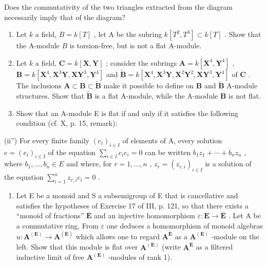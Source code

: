 Does the commutativity of the two triangles extracted from the diagram necessarily imply that of the diagram?

\begin{enumerate}
\def\labelenumi{\arabic{enumi})}
\setcounter{enumi}{3}
\item
  Let \(k\) a field, \(B = k[T]\) , let A be the subring \(k[T^2, T^3] \subset k[T]\) . Show that the A-module \(B\) is torsion-free, but is not a flat A-module.
\item
  Let \(k\) a field, \(\mathbf{C} = k[\mathbf{X}, \mathbf{Y}]\) ; consider the subrings \(\mathbf{A} = k[\mathbf{X}^4, \mathbf{Y}^4]\) , \(\mathbf{B} = k[\mathbf{X}^4, \mathbf{X}^3\mathbf{Y}, \mathbf{XY}^3, \mathbf{Y}^4]\) and \(\tilde{\mathbf{B}} = k[\mathbf{X}^4, \mathbf{X}^3\mathbf{Y}, \mathbf{X}^2\mathbf{Y}^2, \mathbf{XY}^3, \mathbf{Y}^4]\) of \(\mathbf{C}\) . The inclusions \(\mathbf{A} \subset \mathbf{B} \subset \tilde{\mathbf{B}}\) make it possible to define on \(\mathbf{B}\) and \(\tilde{\mathbf{B}}\) A-module structures. Show that \(\tilde{\mathbf{B}}\) is a flat A-module, while the A-module \(\mathbf{B}\) is not flat.
\item
  Show that an A-module E is flat if and only if it satisfies the following condition (cf. X, p. 15, remark):
\end{enumerate}

(ii'') For every finite family \((c_{i})_{i\in I}\) of elements of A, every solution \(e = (e_i)_{i\in I}\) of the equation \(\sum_{i\in I}c_i e_i = 0\) can be written \(b_1 z_1 + \cdots + b_n z_n\) , where \(b_1, \ldots, b_n \in E\) and where, for \(r = 1, \ldots, n\) , \(z_r = (z_{r,i})_{i \in I}\) is a solution of the equation \(\sum_{i=1}^{n} z_{r,i} c_i = 0\) .

\begin{enumerate}
\def\labelenumi{\arabic{enumi})}
\setcounter{enumi}{6}
\tightlist
\item
  Let E be a monoid and S a subsemigroup of E that is cancellative and satisfies the hypotheses of Exercise 17 of III, p. 121, so that there exists a “monoid of fractions” \(\overline{\mathbf{E}}\) and an injective homomorphism \(\varepsilon: \mathbf{E} \to \overline{\mathbf{E}}\) . Let A be a commutative ring. From \(\varepsilon\) one deduces a homomorphism of monoid algebras \(u: \mathbf{A}^{(\mathbf{E})} \to \mathbf{A}^{(\overline{\mathbf{E}})}\) which allows one to regard \(\mathbf{A}^{\overline{\mathbf{E}}}\) as a \(\mathbf{A}^{(\mathbf{E})}\) -module on the left. Show that this module is flat over \(\mathbf{A}^{(\mathbf{E})}\) (write \(\mathbf{A}^{\overline{\mathbf{E}}}\) as a filtered inductive limit of free \(\mathbf{A}^{(\mathbf{E})}\) -modules of rank 1).
\end{enumerate}

